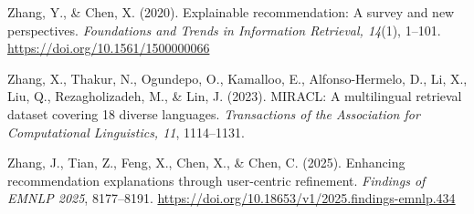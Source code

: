 Zhang, Y., \& Chen, X. (2020). Explainable recommendation: A survey and new perspectives.
\emph{Foundations and Trends in Information Retrieval, 14}(1), 1--101.
\url{https://doi.org/10.1561/1500000066}

Zhang, X., Thakur, N., Ogundepo, O., Kamalloo, E., Alfonso-Hermelo, D., Li, X., Liu, Q.,
Rezagholizadeh, M., \& Lin, J. (2023). MIRACL: A multilingual retrieval dataset covering 18
diverse languages. \emph{Transactions of the Association for Computational Linguistics, 11},
1114--1131.

Zhang, J., Tian, Z., Feng, X., Chen, X., \& Chen, C. (2025). Enhancing recommendation
explanations through user-centric refinement. \emph{Findings of EMNLP 2025}, 8177--8191.
\url{https://doi.org/10.18653/v1/2025.findings-emnlp.434}
